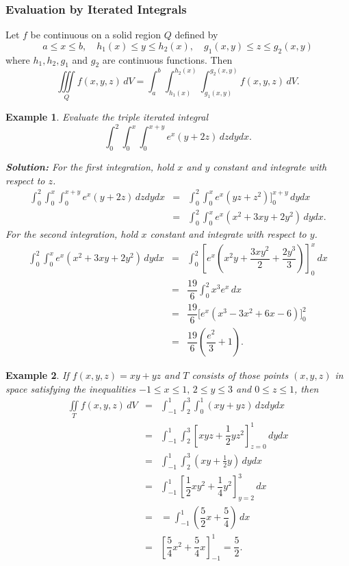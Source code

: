 \documentclass[titlepage,a4paper,12pt]{report}
\newtheorem{example}{Example}[section]
\begin{document}
\subsubsection{Evaluation by Iterated Integrals}
Let $f$ be continuous on a solid region $Q$ defined by 
\[a\leq x\leq b, \quad h_1(x)\leq y \leq h_2(x), \quad g_1(x,y)\leq z \leq g_2(x,y)\] where $h_1, h_2, g_1$ and $g_2$ are continuous functions. Then 
\[\iiint \limits_Q f(x,y,z)\, dV =\int _a^b \int _{h_1(x)}^{h_2(x)}\int _{g_1(x,y)}^{g_2(x,y)}f(x,y,z)\, dV.\]
\begin{example}
Evaluate the triple iterated integral 
\[\int _0^2 \int _0^x \int _0^{x+y}e^x(y+2z)\, dzdydx.\]

\noindent \textbf{Solution:} For the first integration, hold $x$ and $y$ constant and integrate with respect to $z$. 
\begin{eqnarray*}
\int _0^2 \int _0^x \int _0^{x+y}e^x(y+2z)\, dzdydx &=& \int _0^2\int _0^x e^x(yz+z^2)\Biggl ]_0^{x+y} \, dydx \\
&=& \int _0^2 \int _0^x e^x(x^2+3xy+2y^2)\, dydx.
\end{eqnarray*}
For the second integration, hold $x$ constant and integrate with respect to $y$.
\begin{eqnarray*}
\int _0^2 \int _0^x e^x(x^2+3xy+2y^2)\, dydx &=& \int _0^2 \left[ e^x\left(x^2y+\dfrac{3xy^2}{2}+\dfrac{2y^3}{3}\right)\right]_0^x \, dx \\
&=& \dfrac{19}{6}\int _0^2 x^3e^x\, dx \\
&=& \dfrac{19}{6}\Biggl[e^x(x^3-3x^2+6x-6)\Biggr]_0^2 \\
&=& \dfrac{19}{6}\left(\dfrac{e^2}{3}+1\right).
\end{eqnarray*}
\end{example}
\begin{example}
If $f(x,y,z)=xy+yz$ and $T$ consists of those points $(x,y,z)$ in space satisfying the inequalities $-1\leq x\leq 1, \, 2\leq y\leq 3$ and $0\leq z\leq 1$, then 
\begin{eqnarray*}
\iint \limits _T f(x,y,z)\, dV & =& \int _{-1}^1 \int _2^3\int _0^1 (xy+yz)\, dzdydx\\
&=& \int _{-1}^1\int _2^3 \left[xyz+\dfrac{1}{2}yz^2\right]_{z=0}^1\, dydx\\
&=& \int _{-1}^1\int _2^3 \left(xy+\frac{1}{2}y\right)\, dydx\\
&=& \int _{-1}^1\left[\dfrac{1}{2}xy^2+\dfrac{1}{4}y^2\right]_{y=2}^3\, dx\\
&=& =\int _{-1}^1 \left(\dfrac{5}{2}x+\dfrac{5}{4}\right)\, dx \\
&=& \left[\dfrac{5}{4}x^2+\dfrac{5}{4}x\right]_{-1}^1=\dfrac{5}{2}.
\end{eqnarray*}
\end{example}
\end{document}
